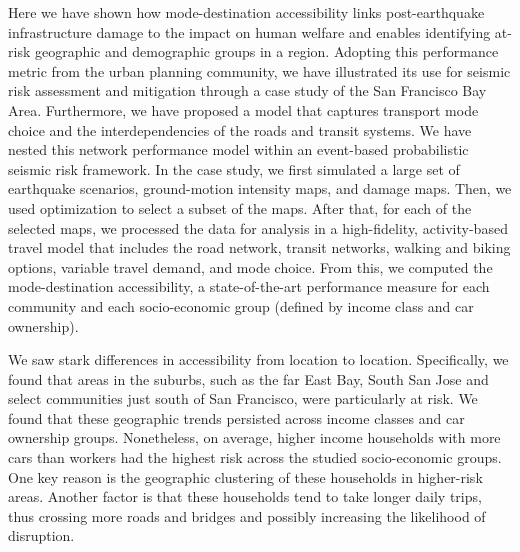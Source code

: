 Here we have shown how mode-destination accessibility links post-earthquake infrastructure damage to the impact on human welfare and enables identifying at-risk geographic and demographic groups in a region. 
Adopting this performance metric from the urban planning community, we have illustrated its use for seismic risk assessment and mitigation through a case study of the San Francisco Bay Area. Furthermore, we have proposed a model that captures transport mode choice and the interdependencies of the roads and transit systems. We have nested this network performance model within an event-based probabilistic seismic risk framework. 
In the case study, we first simulated a large set of earthquake scenarios, ground-motion intensity maps, and damage maps. Then, we used optimization to select a subset of the maps. After that, for each of the selected maps, we processed the data for analysis in a high-fidelity, activity-based travel model that includes the road network, transit networks, walking and biking options, variable travel demand, and mode choice. 
From this, we computed the mode-destination accessibility, a state-of-the-art performance measure for each community and each socio-economic group (defined by income class and car ownership). 


We saw stark differences in accessibility from location to location. Specifically, we found that areas in the suburbs, such as the far East Bay, South San Jose and select communities just south of San Francisco, were particularly at risk. We found that these geographic trends persisted across income classes and car ownership groups. Nonetheless, on average, higher income households with more cars than workers had the highest risk across the studied socio-economic groups. One key reason is the geographic clustering of these households in higher-risk areas. Another factor is that these households tend to take longer daily trips, thus crossing more roads and bridges and possibly increasing the likelihood of disruption.

